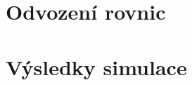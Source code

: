 \section{Odvození rovnic}
\label{sec:odvozeni-rovnic}


\section{Výsledky simulace}
\label{sec:vysledky-simulace}


